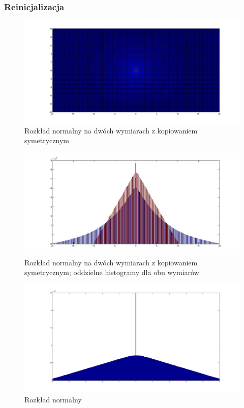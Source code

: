 \documentclass{mini}
\begin{document}
\subsubsection*{Reinicjalizacja}

\begin{figure}[H]
\centering
\includegraphics[width=\textwidth]{ri_n_10M_2__20_20__10_10_4}
\caption{Rozkład normalny na dwóch wymiarach z kopiowaniem symetrycznym}
\end{figure}

\begin{figure}[H]
\centering
\includegraphics[width=\textwidth]{ri_n_10M_2__20_20__10_10_4_1D}
\caption{Rozkład normalny na dwóch wymiarach z kopiowaniem symetrycznym; oddzielne histogramy dla obu wymiarów}
\end{figure}

\begin{figure}[H]
\centering
\includegraphics[width=\textwidth]{ri_n_20M_1__5_5}
\caption{Rozkład normalny}
\end{figure}
\end{document}

